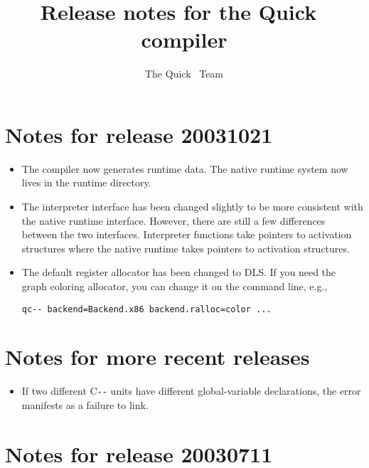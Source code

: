 \documentclass{article}
\title{Release notes for the Quick~{\PAL} compiler}
\author{The Quick~{\PAL} Team}
\def\PAL{\mbox{C{\texttt{-{}-}}}}
\begin{document}
\maketitle

\section{Notes for release 20031021}
\begin{itemize}
\item
The compiler now generates runtime data. The native runtime system now
lives in the runtime directory.
\item
The interpreter interface has been changed slightly to be more
consistent with the native runtime interface. However, there are still
a few differences between the two interfaces. Interpreter functions
take pointers to activation structures where the native runtime takes
pointers to activation structures.
\item
The default register allocator has been changed to DLS. If you need
the graph coloring allocator, you can change it on the command line,
e.g.,
\begin{verbatim}
qc-- backend=Backend.x86 backend.ralloc=color ...
\end{verbatim}


\end{itemize}

\section{Notes for more recent releases}

\begin{itemize}
\item
If two different {\PAL} units have different global-variable
declarations, the error manifests as a failure to link.
\end{itemize}


\section{Notes for release 20030711}
\end{document}
